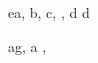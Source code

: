 \begin{eqcode}{e}{a, b, c}{, , }{}
  d \in {} \lend
  d \gets {} \lend
   \lend
\end{eqcode}

\begin{eqcode}{a}{g, a }{, }{}
   \lend  
\end{eqcode}
